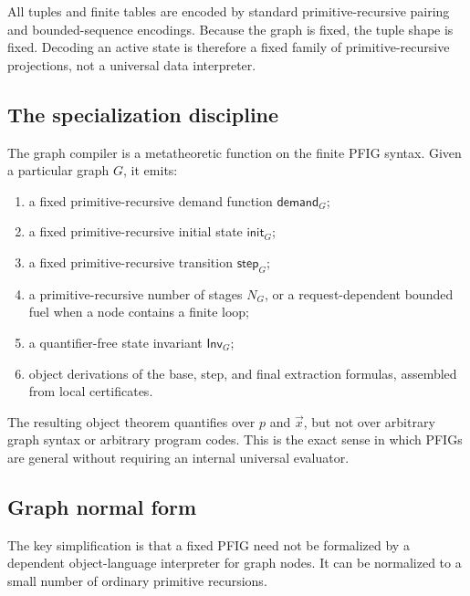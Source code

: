 All tuples and finite tables are encoded by standard primitive-recursive pairing and bounded-sequence encodings.  Because the graph is fixed, the tuple shape is fixed.  Decoding an active state is therefore a fixed family of primitive-recursive projections, not a universal data interpreter.

\subsection{The specialization discipline}

The graph compiler is a metatheoretic function on the finite PFIG syntax.  Given a particular graph \(G\), it emits:

\begin{enumerate}
\item a fixed primitive-recursive demand function \(\mathsf{demand}_G\);
\item a fixed primitive-recursive initial state \(\mathsf{init}_G\);
\item a fixed primitive-recursive transition \(\mathsf{step}_G\);
\item a primitive-recursive number of stages \(N_G\), or a request-dependent bounded fuel when a node contains a finite loop;
\item a quantifier-free state invariant \(\mathsf{Inv}_G\);
\item object derivations of the base, step, and final extraction formulas, assembled from local certificates.
\end{enumerate}

The resulting object theorem quantifies over \(p\) and \(\vec{x}\), but not over arbitrary graph syntax or arbitrary program codes.  This is the exact sense in which PFIGs are general without requiring an internal universal evaluator.

\subsection{Graph normal form}

The key simplification is that a fixed PFIG need not be formalized by a dependent object-language interpreter for graph nodes.  It can be normalized to a small number of ordinary primitive recursions.

